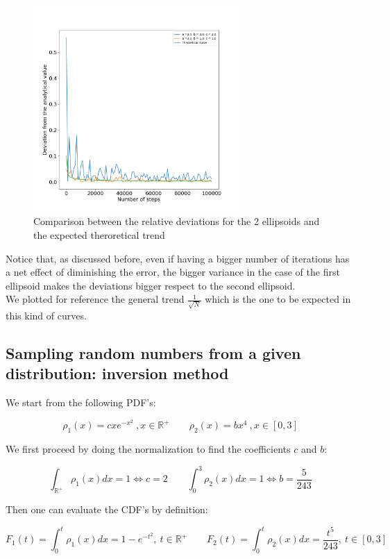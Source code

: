 \begin{figure}[h]
  \centering
  \includegraphics[width=0.7\textwidth]{FIG/exercise_0_images/relative_error_trend.png}
  \caption{Comparison between the relative deviations for the 2 ellipsoids and the expected theroretical trend}
  \label{lec1:deviation_comparison}
  \end{figure}


Notice that, as discussed before, even if having a bigger number of iterations has a net effect of diminishing the error, the bigger variance in 
the case of the first ellipsoid makes the deviations bigger respect to the second ellipsoid. \\
We plotted for reference the general trend $\frac{1}{\sqrt{N}}$ which is the one to be expected in this kind of curves.  


\subsection*{Sampling random numbers from a given distribution: inversion method}

We start from the following PDF's:

$$ \rho_1(x) = cxe^{-x^2}\ ,x \in \mathbb{R}^+ \qquad \rho_2(x) = bx^4\ , x \in [0,3]$$

We first proceed by doing the normalization to find the coefficients $c$ and $b$:

$$ \int_{\mathbb{R}^+}\rho_1(x)dx =1 \iff c=2 \qquad \int_{0}^3\rho_2(x)dx =1 \iff b = \frac{5}{243} $$

Then one can evaluate the CDF's by definition:

$$ F_1(t)=\int_{0}^t\rho_1(x)dx = 1-e^{-t^2}, \ t \in \mathbb{R}^+ \qquad F_2(t)=\int_{0}^t\rho_2(x)dx = \frac{t^5}{243}, \ t \in [0,3] $$

